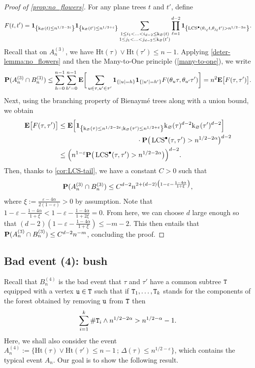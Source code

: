 \documentclass[11pt,reqno]{amsart}
\newcommand{\Ht}{\mathrm{Ht}}
\newcommand{\rk}{\mathrm{k}}
\newcommand{\LCS}{\operatorname{LCS}}
\renewcommand{\emptyset}{\varnothing}
\begin{document}
\begin{proof}[Proof of \cref{prop:no_flowers}]
For any plane trees $t$ and $t'$, define
\[F(t,t')=\I{\rk_\varnothing(t)\leq n^{1/2-2\varepsilon}}\I{\rk_\varnothing(t')\leq n^{1/2+\varepsilon}} \sum_{\substack{1 \leq i_1 < \ldots < i_{d-2} \leq \rk_\emptyset(t) \\ 1 \leq j_1 < \ldots < j_{d-2} \leq \rk_\emptyset(t')}}\prod_{\ell=1}^{d-2} \I{\LCS^\bullet(\theta_{i_\ell}t , \theta_{j_\ell}t') > n^{1/2-2\alpha}}.\]
Recall that on $A_n^{(3)}$, we have $\Ht(\tau)\vee \Ht(\tau')\leq n-1$. Applying \cref{deter-lemma:no_flowers} and then the Many-to-One principle (\cref{many-to-one}), we write
\[
\mathbf{P}(A_n^{(3)} \cap B_n^{(3)})\leq \sum_{h=0}^{n-1} \sum_{h'=0}^{n-1} {\mathbf E}\bigg[\sum_{u\in\tau,u'\in\tau'}{\mathbf 1}_{\left\{|u|=h\right\}}{\mathbf 1}_{\left\{|u'|=h'\right\}} F(\theta_u \tau,\theta_{u'}\tau')\bigg]=n^2{\mathbf E}\big[F(\tau,\tau')\big].
\]
Next, using the branching property of Bienaymé trees along with a union bound, we obtain
\begin{align*}
\E\big[F(\tau,\tau')\big] &\leq
    \begin{multlined}[t]
    \E\Big[\I{\rk_\varnothing(\tau)\leq n^{1/2-2\varepsilon};\rk_\varnothing(\tau')\leq n^{1/2+\varepsilon}}\rk_\varnothing(\tau)^{d-2}\rk_\varnothing(\tau')^{d-2}\Big]\\
    \cdot \prob\big(\LCS^\bullet(\tau,\tau')>n^{1/2-2\alpha}\big)^{d-2}
    \end{multlined}\\
&\leq \Big(n^{1-\varepsilon}\prob\big(\LCS^\bullet(\tau,\tau')>n^{1/2-2\alpha}\big)\Big)^{d-2}.
\end{align*}
Then, thanks to \cref{cor:LCS-tail}, we have a constant $C > 0$ such that
\[\mathbf{P}(A_n^{(3)}\cap B_n^{(3)}) \leq C^{d-2}n^{2+(d-2)\big(1-\varepsilon - \frac{1-4\alpha}{1+\xi}\big)},\]
where $\xi:=\frac{\varepsilon-4\alpha}{2(1-\varepsilon)}>0$ by assumption. Note that $1-\varepsilon-\frac{1-4\alpha}{1+\xi}<1-\varepsilon-\frac{1-4\alpha}{1+2\xi}=0$. From here, we can choose $d$ large enough so that $(d-2)(1-\varepsilon - \frac{1-4\alpha}{1+\xi})\leq -m-2$. This then entails that $\mathbf{P}(A_n^{(3)}\cap B_n^{(3)}) \leq C^{d-2}n^{-m}$, concluding the proof.
\end{proof}

\subsection{Bad event (4): bush}
Recall that $B_n^{(4)}$ is the bad event that $\tau$ and $\tau'$ have a common subtree $\mathtt{T}$ equipped with a vertex $\mathtt{u}\in\mathtt{T}$ such that if $\mathtt{T}_1,\ldots,\mathtt{T}_k$ stands for the components of the forest obtained by removing $\mathtt{u}$ from $\mathtt{T}$ then
\[\sum_{i=1}^k \#\mathtt{T}_i\wedge n^{1/2-2\alpha} > n^{1/2-\alpha}-1.\]
Here, we shall also consider the event $A_n^{(4)}:=\big\{\Ht(\tau)\vee\Ht(\tau')\leq n-1 \,;\, \Delta(\tau)\leq n^{1/2-\varepsilon}\big\}$, which contains the typical event $A_n$. Our goal is to show the following result.
\end{document}
